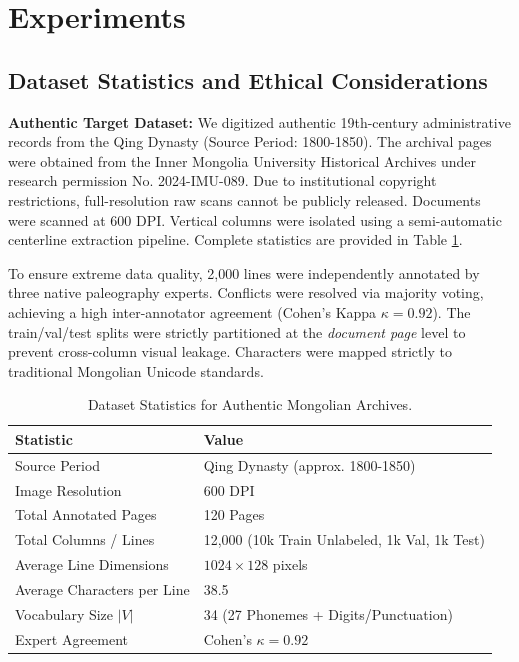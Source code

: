 \documentclass[11pt]{article}
\begin{document}
\section{Experiments}

\subsection{Dataset Statistics and Ethical Considerations}
\textbf{Authentic Target Dataset:} We digitized authentic 19th-century administrative records from the Qing Dynasty (Source Period: 1800-1850). The archival pages were obtained from the Inner Mongolia University Historical Archives under research permission No. 2024-IMU-089. Due to institutional copyright restrictions, full-resolution raw scans cannot be publicly released. Documents were scanned at 600 DPI. Vertical columns were isolated using a semi-automatic centerline extraction pipeline. Complete statistics are provided in Table \ref{tab:dataset}.

To ensure extreme data quality, 2,000 lines were independently annotated by three native paleography experts. Conflicts were resolved via majority voting, achieving a high inter-annotator agreement (Cohen's Kappa $\kappa = 0.92$). The train/val/test splits were strictly partitioned at the \textit{document page} level to prevent cross-column visual leakage. Characters were mapped strictly to traditional Mongolian Unicode standards.

\begin{table}[htbp]
\centering
\caption{Dataset Statistics for Authentic Mongolian Archives.}
\label{tab:dataset}
\begin{tabular}{l l}
\toprule
\textbf{Statistic} & \textbf{Value} \\
\midrule
Source Period & Qing Dynasty (approx. 1800-1850) \\
Image Resolution & 600 DPI \\
Total Annotated Pages & 120 Pages \\
Total Columns / Lines & 12,000 (10k Train Unlabeled, 1k Val, 1k Test) \\
Average Line Dimensions & $1024 \times 128$ pixels \\
Average Characters per Line & 38.5 \\
Vocabulary Size $|V|$ & 34 (27 Phonemes + Digits/Punctuation) \\
Expert Agreement & Cohen's $\kappa = 0.92$ \\
\bottomrule
\end{tabular}
\end{table}
\end{document}
